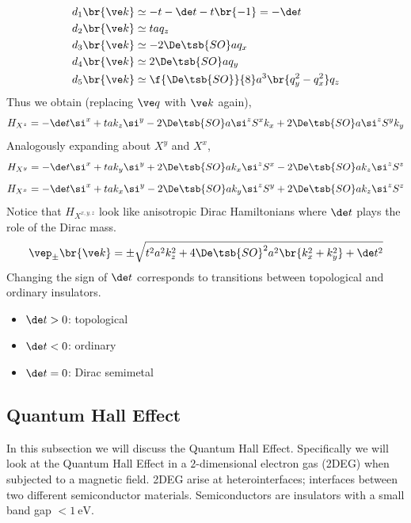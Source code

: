 \documentclass{article}
\begin{document}
\begin{align*}
    d_1\br{\ve k} &\simeq -t - \de t - t \br{-1} = - \de t \\
    d_2\br{\ve k} &\simeq t a q_z \\
    d_3\br{\ve k} &\simeq -2\De\tsb{SO} a q_x \\
    d_4\br{\ve k} &\simeq 2\De\tsb{SO} a q_y \\
    d_5\br{\ve k} &\simeq \f{\De\tsb{SO}}{8} a^3 \br{q_y^2 - q_x^2} q_z
\end{align*}
Thus we obtain (replacing $\ve q$ with $\ve k$ again),
\[ H_{X^{z}} = - \de t \si^{x} + t a k_z \si^{y} - 2 \De\tsb{SO} a \si^{z} S^{x} k_x + 2 \De\tsb{SO} a \si^{z} S^{y} k_y \]
Analogously expanding about $X^{y}$ and $X^{x}$,
\[ H_{X^{y}} = - \de t \si^{x} + t a k_y \si^{y} + 2 \De\tsb{SO} a k_x \si^{z} S^{x} - 2 \De\tsb{SO} a k_z \si^{z} S^{z} \]
\[ H_{X^{x}} = - \de t \si^{x} + t a k_x \si^{y} - 2 \De\tsb{SO} a k_y \si^{z} S^{y} + 2 \De\tsb{SO} a k_z \si^{z} S^{z} \]
Notice that $H_{X^{x,y,z}}$ look like anisotropic Dirac Hamiltonians where $\de t$ plays the role of the Dirac mass.
\[ \vep_{\pm}\br{\ve k} = \pm \sqrt{t^2 a^2 k_z^2 + 4 \De\tsb{SO}^2 a^2 \br{k_x^2 + k_y^2} + \de t^2} \]
Changing the sign of $\de t$ corresponds to transitions between topological and ordinary insulators.
\begin{itemize}
    \item $\de t > 0$: topological
    \item $\de t < 0$: ordinary
    \item $\de t = 0$: Dirac semimetal
\end{itemize}

\subsection{Quantum Hall Effect}

In this subsection we will discuss the Quantum Hall Effect. Specifically we will look at the Quantum Hall Effect in a $2$-dimensional electron gas (2DEG) when subjected to a magnetic field. 2DEG arise at heterointerfaces; interfaces between two different semiconductor materials. Semiconductors are insulators with a small band gap $<\SI{1}{\eV}$.

\begin{center}
\end{center}
\end{document}
